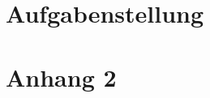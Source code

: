 \section{Aufgabenstellung}\label{sec:aufgabenstellung}

\pagebreak
\section{Anhang 2}\label{sec:anhang_2}
\lipsum[1]